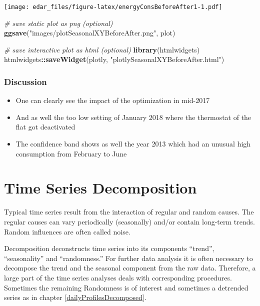 \documentclass[
]{book}
\newenvironment{Shaded}{\begin{snugshade}}{\end{snugshade}}
\newcommand{\CommentTok}[1]{\textcolor[rgb]{0.56,0.35,0.01}{\textit{#1}}}
\newcommand{\KeywordTok}[1]{\textcolor[rgb]{0.13,0.29,0.53}{\textbf{#1}}}
\newcommand{\NormalTok}[1]{#1}
\newcommand{\OperatorTok}[1]{\textcolor[rgb]{0.81,0.36,0.00}{\textbf{#1}}}
\newcommand{\StringTok}[1]{\textcolor[rgb]{0.31,0.60,0.02}{#1}}
\let\oldShaded\Shaded
\let\endoldShaded\endShaded
\renewenvironment{Shaded}{\footnotesize\oldShaded}{\endoldShaded}
\begin{document}
\texttt{[image: edar\_files/figure-latex/energyConsBeforeAfter1-1.pdf]}

\begin{Shaded}
\begin{Highlighting}[]
\CommentTok{# save static plot as png (optional)}
\KeywordTok{ggsave}\NormalTok{(}\StringTok{"images/plotSeasonalXYBeforeAfter.png"}\NormalTok{, plot)}
\end{Highlighting}
\end{Shaded}

\begin{Shaded}
\begin{Highlighting}[]
\CommentTok{# save interactive plot as html (optional)}
\KeywordTok{library}\NormalTok{(htmlwidgets)}
\NormalTok{htmlwidgets}\OperatorTok{::}\KeywordTok{saveWidget}\NormalTok{(plotly, }\StringTok{"plotlySeasonalXYBeforeAfter.html"}\NormalTok{)}
\end{Highlighting}
\end{Shaded}

\hypertarget{discussion-3}{%
\subsection{Discussion}\label{discussion-3}}

\begin{itemize}
\item
  One can clearly see the impact of the optimization in mid-2017
\item
  And as well the too low setting of January 2018 where the thermostat of the flat got deactivated
\item
  The confidence band shows as well the year 2013 which had an unusual high consumption from February to June
\end{itemize}

\hypertarget{time-series-decomposition}{%
\chapter{Time Series Decomposition}\label{time-series-decomposition}}

Typical time series result from the interaction of regular and random causes. The regular causes can vary periodically (seasonally) and/or contain long-term trends. Random influences are often called noise.

Decomposition deconstructs time series into its components ``trend'', ``seasonality'' and ``randomness.'' For further data analysis it is often necessary to decompose the trend and the seasonal component from the raw data. Therefore, a large part of the time series analyses deals with corresponding procedures. Sometimes the remaining Randomness is of interest and sometimes a detrended series as in chapter \ref{dailyProfilesDecomposed}.
\end{document}
